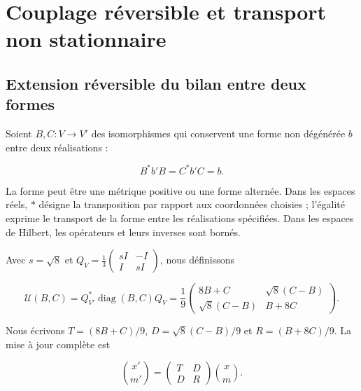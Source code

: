 \chapter{Couplage réversible et transport non stationnaire}
\label{x_reciprocidad:nuclear:10}
\section{Extension réversible du bilan entre deux formes}

Soient \(B,C:V\to V'\) des isomorphismes qui conservent une forme non dégénérée \(b\) entre deux réalisations :



\[
B^*b'B=C^*b'C=b.
\]



La forme peut être une métrique positive ou une forme alternée. Dans les espaces réels, \(*\) désigne la transposition par rapport aux coordonnées choisies ; l’égalité exprime le transport de la forme entre les réalisations spécifiées. Dans les espaces de Hilbert, les opérateurs et leurs inverses sont bornés.

Avec \(s=\sqrt8\) et \(Q_V=\frac13\left(\begin{smallmatrix}sI&-I\\I&sI\end{smallmatrix}\right)\), nous définissons



\begin{equation}
\boxed{
\mathcal U(B,C)=Q_{V'}^*\operatorname{diag}(B,C)Q_V
=\frac19\begin{pmatrix}8B+C&\sqrt8(C-B)\\\sqrt8(C-B)&B+8C\end{pmatrix}.}
\label{x_reciprocidad:nuc10:eq:1}
\end{equation}



Nous écrivons \(T=(8B+C)/9\), \(D=\sqrt8(C-B)/9\) et \(R=(B+8C)/9\). La mise à jour complète est



\begin{equation}
\binom{x'}{m'}=\begin{pmatrix}T&D\\D&R\end{pmatrix}\binom{x}{m}.
\label{x_reciprocidad:nuc10:eq:2}
\end{equation}



